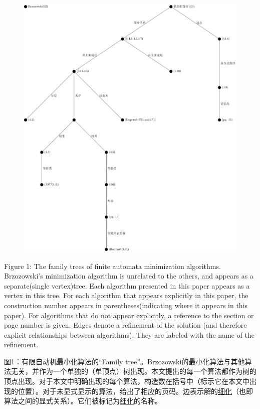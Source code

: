 \begin{figure}[!htbp]
    \centering
    \includegraphics[width =.50\textwidth]{Figure/familytree.pdf}
    \caption{}
    \label{fig:1}
\end{figure}


Figure 1: The family trees of finite automata minimization algorithms. Brzozowski's minimization algorithm is unrelated to the others, and appears as a separate(single vertex)tree. Each algorithm presented in this paper appears as a vertex in this tree. For each algorithm that appears explicitly in this paper, the construction number appears in parentheses(indicating where it appears in this paper). For algorithms that do not appear explicitly, a reference to the section or page number is given. Edges denote a refinement of the solution (and therefore explicit relationships between algorithms). They are labeled with the name of the refinement.

图1：有限自动机最小化算法的“Family tree”。Brzozowski的最小化算法与其他算法无关，并作为一个单独的（单顶点）树出现。本文提出的每一个算法都作为树的顶点出现。对于本文中明确出现的每个算法，构造数在括号中（标示它在本文中出现的位置）。对于未显式显示的算法，给出了相应的页码。边表示解的\uline{细化}（也即算法之间的显式关系）。它们被标记为\uline{细化}的名称。

